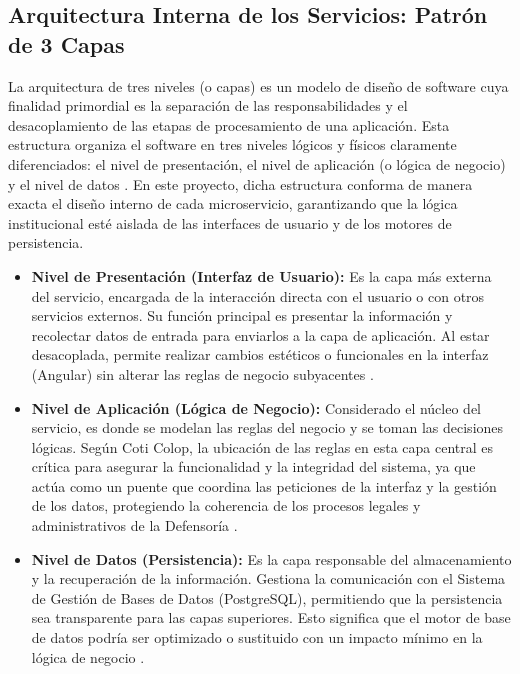 \subsection{Arquitectura Interna de los Servicios: Patrón de 3 Capas}

La arquitectura de tres niveles (o capas) es un modelo de diseño de software cuya finalidad primordial es la separación de las responsabilidades y el desacoplamiento de las etapas de procesamiento de una aplicación. Esta estructura organiza el software en tres niveles lógicos y físicos claramente diferenciados: el nivel de presentación, el nivel de aplicación (o lógica de negocio) y el nivel de datos \cite{33} \cite{40} . En este proyecto, dicha estructura conforma de manera exacta el diseño interno de cada microservicio, garantizando que la lógica institucional esté aislada de las interfaces de usuario y de los motores de persistencia.

\begin{itemize}
\item \textbf{Nivel de Presentación (Interfaz de Usuario):} Es la capa más externa del servicio, encargada de la interacción directa con el usuario o con otros servicios externos. Su función principal es presentar la información y recolectar datos de entrada para enviarlos a la capa de aplicación. Al estar desacoplada, permite realizar cambios estéticos o funcionales en la interfaz (Angular) sin alterar las reglas de negocio subyacentes \cite{33} \cite{40} .

\item \textbf{Nivel de Aplicación (Lógica de Negocio):} Considerado el núcleo del servicio, es donde se modelan las reglas del negocio y se toman las decisiones lógicas. Según Coti Colop, la ubicación de las reglas en esta capa central es crítica para asegurar la funcionalidad y la integridad del sistema, ya que actúa como un puente que coordina las peticiones de la interfaz y la gestión de los datos, protegiendo la coherencia de los procesos legales y administrativos de la Defensoría \cite{33} .

\item \textbf{Nivel de Datos (Persistencia):} Es la capa responsable del almacenamiento y la recuperación de la información. Gestiona la comunicación con el Sistema de Gestión de Bases de Datos (PostgreSQL), permitiendo que la persistencia sea transparente para las capas superiores. Esto significa que el motor de base de datos podría ser optimizado o sustituido con un impacto mínimo en la lógica de negocio \cite{42} .

\end{itemize}

